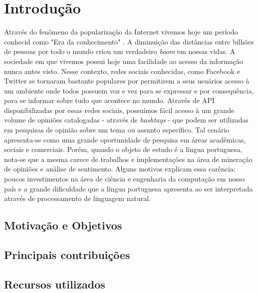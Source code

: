 \chapter{Introdução} \label{cap:1}

Através do fenômeno da popularização da Internet vivemos hoje um período conhecid como "Era da conhecimento" \cite{lastres1999informaccao}. A diminuição das distâncias entre bilhões de pessoas por todo o mundo criou um verdadeiro \textit{boom} em nossas vidas. A sociedade em que vivemos possui hoje uma facilidade ao acesso da informação nunca antes visto. 
Nesse contexto, redes sociais conhecidas, como Facebook e Twitter se tornaram bastante populares por permitirem a seus usuários acesso à um ambiente onde todos possuem voz e vez para se expressar e por consequência, para se informar sobre tudo que acontece no mundo.
Através de \ac{API} disponibilizadas por essas redes sociais, possuímos fácil acesso à um grande volume de opiniões catalogadas - através de \textit{hashtags} - que podem ser utilizadas em pesquisas de opinião sobre um tema ou assunto específico. Tal cenário apresenta-se como uma grande oportunidade de pesquisa em áreas acadêmicas, sociais e comerciais.
Porém, quando o objeto de estudo é a língua portuguesa, nota-se que a mesma carece de trabalhos e implementações na área de mineração de opiniões e análise de sentimento. Alguns motivos explicam essa carência: poucos investimentos na área de ciência e engenharia da computação em nosso país e a grande dificuldade que a língua portuguesa apresenta ao ser interpretada através de processamento de linguagem natural. \cite{santos2000projecto}


\section{Motivação e Objetivos}\label{sec:1_inicio}



\section{Principais contribuições}\label{sec:1_principais_contribuicoes}

\section{Recursos utilizados}\label{sec:1_recursos_utilizados}

